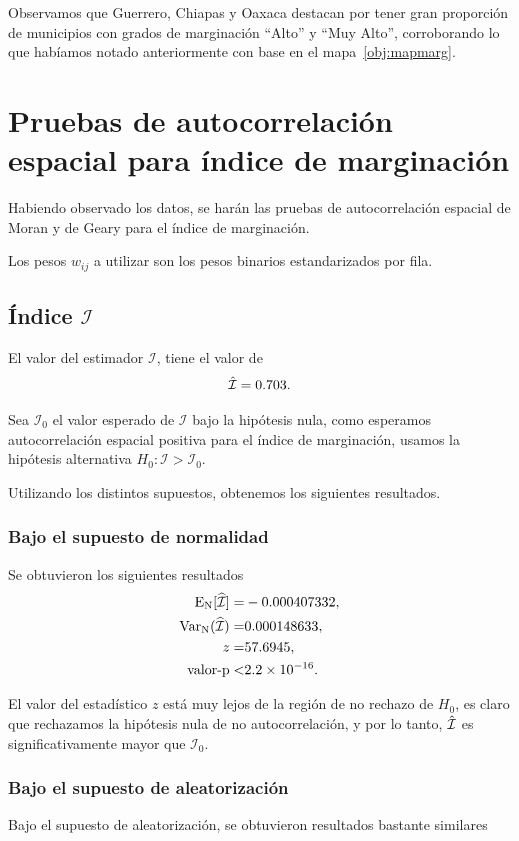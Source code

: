 Observamos que Guerrero, Chiapas y Oaxaca destacan por tener gran proporción de municipios con grados de marginación ``Alto'' y ``Muy Alto'', corroborando lo que habíamos notado anteriormente con base en el mapa~\ref{obj:mapmarg}.

\section{Pruebas de autocorrelación espacial para índice de marginación}
Habiendo observado los datos, se harán las pruebas de autocorrelación espacial de Moran y de Geary para el índice de marginación.

Los pesos $w_{ij}$ a utilizar son los pesos binarios estandarizados por fila.
\subsection{Índice $\mathcal{I}$}
El valor del estimador $\mathcal{I}$, tiene el valor de 
\begin{equation}
\Hat{\mathcal{I}} = 0.703 .
\end{equation}

Sea $\mathcal{I}_0$ el valor esperado de $\mathcal{I}$ bajo la hipótesis nula, como esperamos autocorrelación espacial positiva para el índice de marginación, usamos la hipótesis alternativa $H_0: \mathcal{I}>\mathcal{I}_0$.


Utilizando los distintos supuestos, obtenemos los siguientes resultados.
\subsubsection{Bajo el supuesto de normalidad}
Se obtuvieron los siguientes resultados
\begin{align*}
{\rm{E_N}} [ \widehat{\mathcal{I}}] =& -0.000407332,  \\ 
{\rm{Var_N}}(\widehat{\mathcal{I}}) =& 0.000148633, \\
z =& 57.6945, \\
\mbox{valor-p} <& 2.2 \times 10^{-16}.
\end{align*}

El valor del estadístico $z$ está muy lejos de la región de no rechazo de $H_0$, es claro que rechazamos la hipótesis nula de no autocorrelación, y por lo tanto, $\Hat{\mathcal{I}}$ es significativamente mayor que $\mathcal{I}_0$.

\subsubsection{Bajo el supuesto de aleatorización}
Bajo el supuesto de aleatorización, se obtuvieron resultados bastante similares

